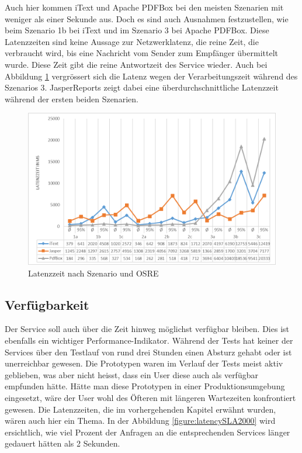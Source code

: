 \documentclass[main.tex]{subfiles}
\begin{document}
Auch hier kommen iText und Apache PDFBox bei den meisten Szenarien mit weniger als einer Sekunde aus. Doch es sind auch Ausnahmen festzustellen, wie beim Szenario 1b bei iText und im Szenario 3 bei Apache PDFBox. 
Diese Latenzzeiten sind keine Aussage zur Netzwerklatenz, die reine Zeit, die verbraucht wird, bis eine Nachricht vom Sender zum Empfänger übermittelt wurde. Diese Zeit gibt die reine Antwortzeit des Service wieder. Auch bei Abbildung \ref{figure:latencySzenario} vergrössert sich die Latenz wegen der Verarbeitungszeit während des Szenarios 3. JasperReports zeigt dabei eine überdurchschnittliche Latenzzeit während der ersten beiden Szenarien.

\begin{figure}[!ht]
\includegraphics[width=\textwidth]{mainpart/4_analyse_img/LatenzzeitSzen.png}
 \caption{Latenzzeit nach Szenario und OSRE}
 \label{figure:latencySzenario}
\end{figure}

\subsection{Verfügbarkeit}

Der Service soll auch über die Zeit hinweg möglichst verfügbar bleiben. Dies ist ebenfalls ein wichtiger Performance-Indikator. Während der Tests hat keiner der Services über den Testlauf von rund drei Stunden einen Absturz gehabt oder ist unerreichbar gewesen. Die Prototypen waren im Verlauf der Tests meist aktiv geblieben, was aber nicht heisst, dass ein User diese auch als verfügbar empfunden hätte. Hätte man diese Prototypen in einer Produktionsumgebung eingesetzt, wäre der User wohl des Öfteren mit längeren Wartezeiten konfrontiert gewesen. Die Latenzzeiten, die im vorhergehenden Kapitel erwähnt wurden, wären auch hier ein Thema. In der Abbildung \ref{figure:latencySLA2000} wird ersichtlich, wie viel Prozent der Anfragen an die entsprechenden Services länger gedauert hätten als 2 Sekunden.
\end{document}
